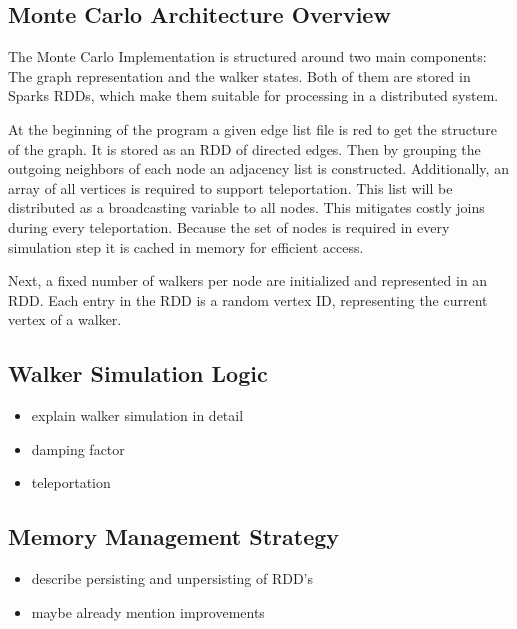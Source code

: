 \subsection{Monte Carlo Architecture Overview}
The Monte Carlo Implementation is structured around two main components: The graph representation and the walker states. Both of them are stored in Sparks RDDs, which make them suitable for processing in a distributed system. \par
At the beginning of the program a given edge list file is red to get the structure of the graph. It is stored as an RDD of directed edges. Then by grouping the outgoing neighbors of each node an adjacency list is constructed. Additionally, an array of all vertices is required to support teleportation. This list will be distributed as a broadcasting variable to all nodes. This mitigates costly joins during every teleportation. Because the set of nodes is required in every simulation step it is cached in memory for efficient access. \par
Next, a fixed number of walkers per node are initialized and represented in an RDD. Each entry in the RDD is a random vertex ID, representing the current vertex of a walker.  



\subsection{Walker Simulation Logic}
\begin{itemize}
    \item explain walker simulation in detail
    \item damping factor
    \item teleportation
\end{itemize}

\subsection{Memory Management Strategy}
\begin{itemize}
    \item describe persisting and unpersisting of RDD's
    \item maybe already mention improvements
\end{itemize}
